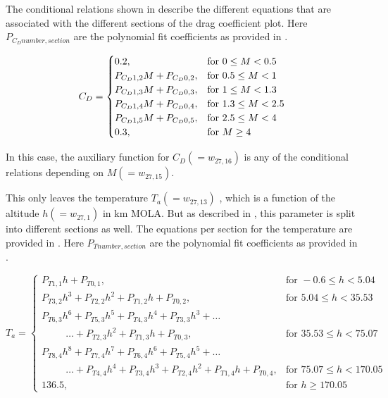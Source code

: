 \noindent
The conditional relations shown in  describe the different equations that are associated with the different sections of the drag coefficient plot. Here $P_{C_{D} number,section}$ are the polynomial fit coefficients as provided in .

\begin{equation}\label{eq:cdCondC}
C_{D}=\begin{cases}
0.2, & \text{for } 0\leq M < 0.5\\
P_{C_{D} 1,2}M+P_{C_{D} 0,2}, &  \text{for } 0.5\leq M < 1 \\
P_{C_{D} 1,3}M+P_{C_{D} 0,3}, &  \text{for } 1\leq M < 1.3 \\
P_{C_{D} 1,4}M+P_{C_{D} 0,4}, &  \text{for } 1.3\leq M < 2.5 \\
P_{C_{D} 1,5}M+P_{C_{D} 0,5}, &  \text{for } 2.5\leq M < 4 \\
0.3, &  \text{for } M \geq 4 
\end{cases}\\
\end{equation}

\noindent
In this case, the auxiliary function for $C_{D} \left( = w_{27,16}\right)$ is any of the conditional relations depending on $M \left( = w_{27,15}\right)$.

\noindent
This only leaves the temperature $T_{a} \left(= w_{27,13}\right)$ , which is a function of the altitude $h \left(= w_{27,1} \right) $ in km \ac{MOLA}. But as described in , this parameter is split into different sections as well. The equations per section for the temperature are provided in . Here $P_{T number,section}$ are the polynomial fit coefficients as provided in .

\begin{equation}\label{eq:tempCondAuxC}
T_{a}=\begin{cases}
P_{T 1,1}h+P_{T 0,1}, & \text{for } -0.6 \leq h < 5.04  \\
P_{T 3,2}h^{3}+P_{T 2,2}h^{2}+P_{T 1,2}h+P_{T 0,2}, &  \text{for } 5.04 \leq h < 35.53   \\
P_{T 6,3}h^{6}+P_{T 5,3}h^{5}+P_{T 4,3}h^{4}+P_{T 3,3}h^{3}+ \dotsc \\
\qquad\ \ \dotsc +P_{T 2,3}h^{2}+P_{T 1,3}h+P_{T 0,3}, &  \text{for } 35.53 \leq h < 75.07   \\
P_{T 8,4}h^{8}+P_{T 7,4}h^{7}+P_{T 6,4}h^{6}+P_{T 5,4}h^{5}+ \dotsc \\
\qquad\ \ \dotsc+P_{T 4,4}h^{4}+P_{T 3,4}h^{3}+P_{T 2,4}h^{2}+P_{T 1,4}h+P_{T 0,4}, &  \text{for } 75.07 \leq h < 170.05   \\
136.5, &  \text{for }  h \geq 170.05   
\end{cases}
\end{equation}

